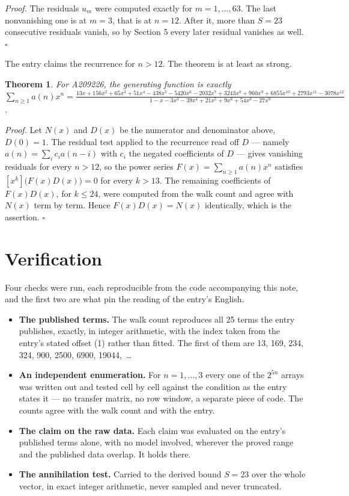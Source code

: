 \documentclass[11pt]{article}
\newtheorem{theorem}{Theorem}
\theoremstyle{definition}
\begin{document}
{\itshape Proof.} The residuals $u_m$ were computed exactly for $m = 1,\dots,63$. The last nonvanishing one is at $m = 3$, that is at $n = 12$. After it, more than $S = 23$ consecutive residuals vanish, so by Section 5 every later residual vanishes as well. $\square$

The entry claims the recurrence for $n > 12$. The theorem is at least as strong.

\begin{theorem} For A209226, the generating function is exactly $\sum_{n\ge 1} a(n)x^n = \frac{13x + 156x^{2} + 65x^{3} + 51x^{4} - 438x^{5} - 5420x^{6} - 2032x^{7} + 3243x^{8} + 960x^{9} + 6855x^{10} + 2793x^{11} - 3078x^{12}}{1 - x - 3x^{3} - 39x^{4} + 21x^{5} + 9x^{6} + 54x^{8} - 27x^{9}}$.\end{theorem}

{\itshape Proof.} Let $N(x)$ and $D(x)$ be the numerator and denominator above, $D(0)=1$. The residual test applied to the recurrence read off $D$ --- namely $a(n) = \sum_i c_i a(n-i)$ with $c_i$ the negated coefficients of $D$ --- gives vanishing residuals for every $n > 12$, so the power series $F(x)=\sum_{n\ge 1}a(n)x^n$ satisfies $[x^k]\bigl(F(x)D(x)\bigr) = 0$ for every $k > 13$. The remaining coefficients of $F(x)D(x)$, for $k \le 24$, were computed from the walk count and agree with $N(x)$ term by term. Hence $F(x)D(x) = N(x)$ identically, which is the assertion. $\square$

\section{Verification}

Four checks were run, each reproducible from the code accompanying this note, and the first two are what pin the reading of the entry's English.

\begin{itemize}

\item {\bfseries The published terms.} The walk count reproduces all 25 terms the entry publishes, exactly, in integer arithmetic, with the index taken from the entry's stated offset (1) rather than fitted. The first of them are 13, 169, 234, 324, 900, 2500, 6900, 19044,~\dots

\item {\bfseries An independent enumeration.} For $n = 1,\dots,3$ every one of the $2^{5n}$ arrays was written out and tested cell by cell against the condition as the entry states it --- no transfer matrix, no row window, a separate piece of code. The counts agree with the walk count and with the entry.

\item {\bfseries The claim on the raw data.} Each claim was evaluated on the entry's published terms alone, with no model involved, wherever the proved range and the published data overlap. It holds there.

\item {\bfseries The annihilation test.} Carried to the derived bound $S = 23$ over the whole vector, in exact integer arithmetic, never sampled and never truncated.

\end{itemize}
\end{document}
